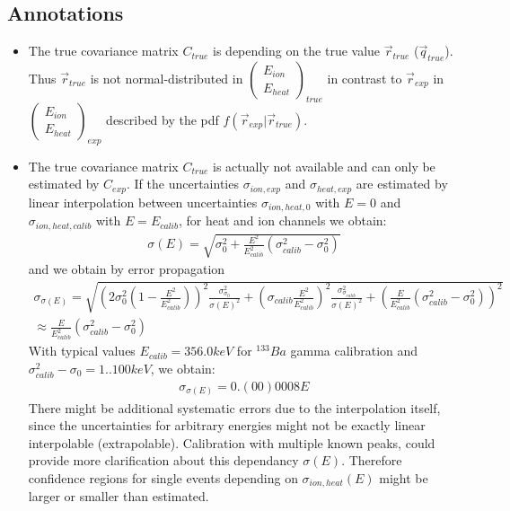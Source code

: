 \subsection*{Annotations}
\begin{itemize}
\item The true covariance matrix $C_{true}$ is depending on the true value $\vec{r}_{true}$ ($\vec{q}_{true}$). Thus $\vec{r}_{true}$ is not normal-distributed in $\begin{pmatrix} E_{ion} \\ E_{heat} \end{pmatrix}_{true}$ in contrast to $\vec{r}_{exp}$ in $\begin{pmatrix} E_{ion} \\ E_{heat} \end{pmatrix}_{exp}$ described by the pdf $f(\vec{r}_{exp} | \vec{r}_{true})$.
\item The true covariance matrix $C_{true}$ is actually not available and can only be estimated by $C_{exp}$. If the uncertainties $\sigma_{ion,exp}$ and $\sigma_{heat,exp}$ are estimated by linear interpolation between uncertainties $\sigma_{ion,heat,0}$ with $E = 0$ and $\sigma_{ion,heat,calib}$ with $E=E_{calib}$, for heat and ion channels we obtain:
\begin{gather}
\sigma(E) = \sqrt{ \sigma_{0}^2 + \frac{E^2}{E_{calib}^2} (\sigma_{calib}^2 - \sigma_{0}^2 )}
\end{gather}
and we obtain by error propagation
\begin{gather}
\sigma_{\sigma(E)} = \sqrt{ \left( 2 \sigma_{0}^2 \left(1- \frac{E^2}{E_{calib}^2} \right) \right)^2 \frac{\sigma_{\sigma_{0}}^2}{\sigma(E)^2} + \left( \sigma_{calib} \frac{E^2}{E_{calib}^2} \right)^2 \frac{\sigma_{\sigma_{calib}}^2}{\sigma(E)^2} + \left( \frac{E}{E_{calib}^2} \left(\sigma_{calib}^2 - \sigma_{0}^2 \right) \right)^2} \\
\approx \frac{E}{E_{calib}^2} \left(\sigma_{calib}^2 - \sigma_{0}^2 \right)
\end{gather}
With typical values $E_{calib} = 356.0 keV$ for $^{133}Ba$ gamma calibration and $\sigma_{calib}^2 - \sigma_{0} = 1..100 keV$, we obtain:
\begin{gather}
\sigma_{\sigma(E)} = 0.(00)0008 E
\end{gather}
There might be additional systematic errors due to the interpolation itself, since the uncertainties for arbitrary energies might not be exactly linear interpolable (extrapolable). Calibration with multiple known peaks, could provide more clarification about this dependancy $\sigma(E)$.
Therefore confidence regions for single events depending on $\sigma_{ion,heat}(E)$ might be larger or smaller than estimated. 

\end{itemize}








